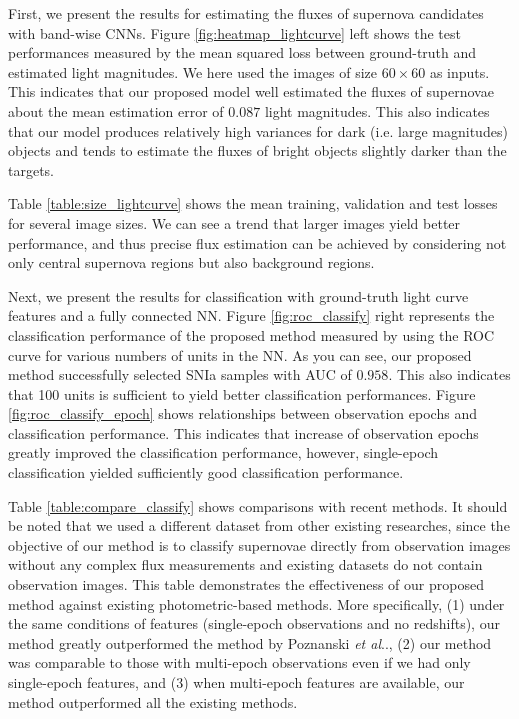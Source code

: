 \documentclass[conference,compsoc]{IEEEtran}
\makeatletter
\DeclareRobustCommand\onedot{\futurelet\@let@token\@onedot}
\def\@onedot{\ifx\@let@token.\else.\null\fi\xspace}
\def\etal{\emph{et al}\onedot}
\makeatother
\begin{document}
  First, we present the results for estimating the fluxes of supernova candidates with band-wise CNNs.
  Figure \ref{fig:heatmap_lightcurve} left shows the test performances measured by the mean squared loss between ground-truth and estimated light magnitudes.
  We here used the images of size $60\times 60$ as inputs. 
  This indicates that our proposed model well estimated the fluxes of supernovae about the mean estimation error of $0.087$ light magnitudes.
  This also indicates that our model produces relatively high variances for dark (i.e. large magnitudes) objects and tends to estimate the fluxes of bright objects slightly darker than the targets.

  Table \ref{table:size_lightcurve} shows the mean training, validation and test losses for several image sizes.
  We can see a trend that larger images yield better performance, and thus precise flux estimation can be achieved by considering not only central supernova regions but also background regions.


  Next, we present the results for classification with ground-truth light curve features and a fully connected NN.
  Figure \ref{fig:roc_classify} right represents the classification performance of the proposed method measured by using the ROC curve for various numbers of units in the NN. %
  As you can see, our proposed method successfully selected SNIa samples with AUC of $0.958$. %
  This also indicates that 100 units is sufficient to yield better classification performances.
  Figure \ref{fig:roc_classify_epoch} shows relationships between observation epochs and classification performance.
  This indicates that increase of observation epochs greatly improved the classification performance, however, single-epoch classification yielded sufficiently good classification performance.

  Table \ref{table:compare_classify} shows comparisons with recent methods.
  It should be noted that we used a different dataset from other existing researches, since the objective of our method is to classify supernovae directly from observation images without any complex flux measurements and existing datasets do not contain observation images.
  This table demonstrates the effectiveness of our proposed method against existing photometric-based methods.
  More specifically, (1) under the same conditions of features (single-epoch observations and no redshifts), our method greatly outperformed the method by Poznanski \etal \cite{Poznanski2007}, (2) our method was comparable to those with multi-epoch observations even if we had only single-epoch features, and (3) when multi-epoch features are available, our method outperformed all the existing methods.
\end{document}
